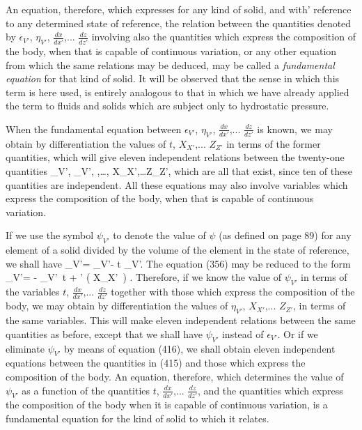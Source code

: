 \documentclass[12pt]{article}
\begin{document}
{An equation, therefore, which expresses for any kind of solid, and with' reference to any determined state of reference, the relation between the quantities denoted by $\epsilon_{V'}$, $\eta_{V'}$, $\frac{dx}{dx'}$,... $\frac{dz}{dz'}$ involving also the quantities which express the composition of the body, when that is capable of continuous variation, or any other equation from which the same relations may be deduced, may be called a \textit{fundamental equation} for that kind of solid. It will be observed that the sense in which this term is here used, is entirely analogous to that in which we have already applied the term to fluids and solids which are subject only to hydrostatic pressure.


When the fundamental equation between $\epsilon_{V'}$, $\eta_{V'}$, $\frac{dx}{dx'}$,... $\frac{dz}{dz'}$ is known, we may obtain by differentiation the values of $t$, $X_{X'}$,... $Z_{Z'}$ in terms of the former quantities, which will give eleven independent relations between the twenty-one quantities
\eqs \epsilon_{V'}, \eta_{V'}, ,\dots {}, X_{X'},\dots Z_{Z'},  \label{415}\eqe
which are all that exist, since ten of these quantities are independent. All these equations may also involve variables which express the composition of the body, when that is capable of continuous variation. 


If we use the symbol $\psi_{V'}$ to denote the value of $\psi$ (as defined on page 89) for any element of a solid divided by the volume of the element in the state of reference, we shall have
\eqs \psi_{V'}= \epsilon_{V'}- t \eta_{V'}.   \label{416}\eqe
The equation (356) may be reduced to the form
\eqs \delta \psi_{V'}= - \eta_{V'}\, \delta t + 
\sum \sum\nolimits' \left( X_{X'} \,\delta {}\right) .  \label{417}\eqe
Therefore, if we know the value of $\psi_{V'}$ in terms of the variables $t$, $\frac{dx}{dx'}$,... $\frac{dz}{dz'}$ together with those which express the composition of the body, we may obtain by differentiation the values of $\eta_{V'}$, $X_{X'}$,... $Z_{Z'}$, in terms of the same variables. This will make eleven independent relations between the same quantities as before, except that we shall have $\psi_{V'}$ instead of $\epsilon_{V'}$. Or if we eliminate $\psi_{V'}$ by means of equation (416), we shall obtain eleven independent equations between the quantities in (415) and those which express the composition of the body. An equation, therefore, which determines the value of $\psi_{V'}$ as a function of the quantities $t$, $\frac{dx}{dx'}$,... $\frac{dz}{dz'}$, and the quantities which express the composition of the body when it is capable of continuous variation, is a fundamental equation for the kind of solid to which it relates.


}
\end{document}
